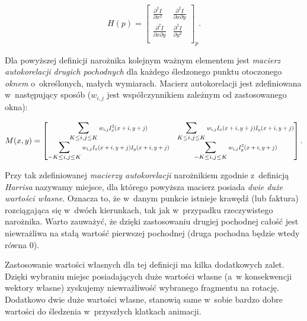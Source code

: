     \[
      H(p) =
        \begin{bmatrix}
          \frac{\partial^2 I}{\partial x^2} & \frac{\partial^2 I}{\partial x\partial y} \\
          \frac{\partial^2 I}{\partial x\partial y} & \frac{\partial^2 I}{\partial y^2} \\
        \end{bmatrix}_{p}.
    \]

    \newpage
    Dla powyższej definicji narożnika kolejnym ważnym elementem jest \textit{macierz autokorelacji drugich pochodnych} dla każdego śledzonego punktu otoczonego \textit{oknem} o~określonych, małych wymiarach. Macierz autokorelacji jest zdefiniowana w~następujący sposób ($w_{i,j}$ jest współczynnikiem zależnym od zastosowanego okna):

    \[
      M(x, y) =
        \begin{bmatrix}
            \displaystyle\sum\limits_{K \le i, j \le K}
              \scalemath{0.75}{w_{i,j} I_{x}^{2} (x + i, y + j)} &
            \displaystyle\sum\limits_{K \le i, j \le K}
              \scalemath{0.75}{w_{i,j} I_{x} (x + i, y + j) I_{y} (x + i, y + j)} \\

            \displaystyle\sum\limits_{-K \le i, j \le K}
              \scalemath{0.75}{w_{i,j} I_{x} (x + i, y + j) I_{y} (x + i, y + j)} &
            \displaystyle\sum\limits_{-K \le i, j \le K}
              \scalemath{0.75}{w_{i,j} I_{y}^{2} (x + i, y + j)} \\
        \end{bmatrix}.
    \]

    Przy tak zdefiniowanej \textit{macierzy autokorelacji} narożnikiem zgodnie z~definicją \textit{Harrisa} nazywamy miejsce, dla którego powyższa macierz posiada \textit{dwie duże wartości własne}. Oznacza to, że w~danym punkcie istnieje krawędź (lub faktura) rozciągająca się w~dwóch kierunkach, tak jak w~przypadku rzeczywistego narożnika. Warto zauważyć, że dzięki zastosowaniu drugiej pochodnej całość jest niewrażliwa na stałą wartość pierwszej pochodnej (druga pochodna będzie wtedy równa $0$).

    Zastosowanie wartości własnych dla tej definicji ma kilka dodatkowych zalet. Dzięki wybraniu miejsc posiadających duże wartości własne (a~w konsekwencji wektory własne) zyskujemy niewrażliwość wybranego fragmentu na rotację. Dodatkowo dwie duże wartości własne, stanowią same w~sobie bardzo dobre wartości do śledzenia w~przyszłych klatkach animacji.

